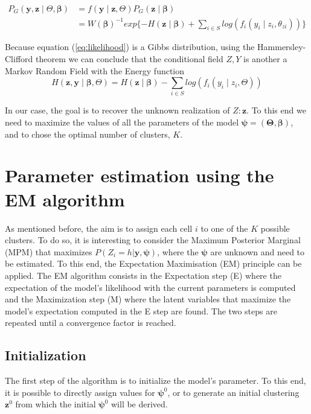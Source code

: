 \begin{align}
\label{eq:likelihood}
P_G(\boldsymbol{y},\boldsymbol{z} \mid \Theta, \boldsymbol{\beta}) &= f(\boldsymbol{y} \mid \boldsymbol{z}, \Theta)P_G(\boldsymbol{z} \mid \boldsymbol{\beta})\nonumber\\
&= W(\boldsymbol{\beta})^{-1}exp\{{-H(\boldsymbol{z} \mid \boldsymbol{\beta})} + \sum\limits_{i \in S}log(f_i(y_i \mid z_i, \theta_{zi}))\}
\end{align}

Because equation (\ref{eq:likelihood}) is a Gibbs distribution, using the Hammersley-Clifford theorem we can conclude that the conditional field $Z, Y$ is another a Markov Random Field with the Energy function 
\[H(\boldsymbol{z}, \boldsymbol{y} \mid \boldsymbol{\beta}, \Theta) = H(\boldsymbol{z} \mid \boldsymbol{\beta}) - \sum\limits_{i \in S} log(f_i(y_i \mid z_i, \Theta))\]

In our case, the goal is to recover the unknown realization of $Z: \boldsymbol{z}$. To this end we need to maximize the values of all the parameters of the model $\boldsymbol{\psi} = (\boldsymbol{\Theta}, \boldsymbol{\beta})$, and to chose the optimal number of clusters, $K$.

\section{Parameter estimation using the EM algorithm}
As mentioned before, the aim is to assign each cell $i$ to one of the $K$ possible clusters. To do so, it is interesting to consider the Maximum Posterior Marginal (MPM) that maximizes $P(Z_{i}=h|\boldsymbol{y}, \boldsymbol{\psi})$, where the $\boldsymbol{\psi}$ are unknown and need to be estimated. To this end, the Expectation Maximisation \cite{dempster77} (EM) principle can be applied. The EM algorithm consists in the Expectation step (E) where the expectation of the model's likelihood with the current parameters is computed and the Maximization step (M) where the latent variables that maximize the model's expectation computed in the E step are found. The two steps are repeated until a convergence factor is reached.\\

	\subsection{Initialization}
The first step of the algorithm is to initialize the model's parameter. To this end, it is possible to directly assign values for $\boldsymbol{\psi}^{0}$, or to generate an initial clustering $\boldsymbol{z}^{0}$ from which the initial $\boldsymbol{\psi}^{0}$ will be derived.\\

